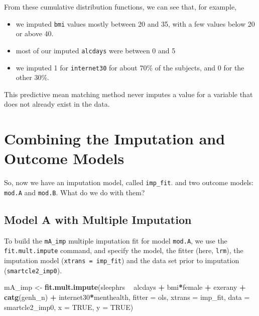 \documentclass[]{book}
\newenvironment{Shaded}{\begin{snugshade}}{\end{snugshade}}
\newcommand{\KeywordTok}[1]{\textcolor[rgb]{0.13,0.29,0.53}{\textbf{#1}}}
\newcommand{\DataTypeTok}[1]{\textcolor[rgb]{0.13,0.29,0.53}{#1}}
\newcommand{\StringTok}[1]{\textcolor[rgb]{0.31,0.60,0.02}{#1}}
\newcommand{\OtherTok}[1]{\textcolor[rgb]{0.56,0.35,0.01}{#1}}
\newcommand{\OperatorTok}[1]{\textcolor[rgb]{0.81,0.36,0.00}{\textbf{#1}}}
\newcommand{\NormalTok}[1]{#1}
\providecommand{\tightlist}{%
  \setlength{\itemsep}{0pt}\setlength{\parskip}{0pt}}
\theoremstyle{definition}
\theoremstyle{definition}
\theoremstyle{definition}
\theoremstyle{remark}
\begin{document}
From these cumulative distribution functions, we can see that, for
example,

\begin{itemize}
\tightlist
\item
  we imputed \texttt{bmi} values mostly between 20 and 35, with a few
  values below 20 or above 40.
\item
  most of our imputed \texttt{alcdays} were between 0 and 5
\item
  we imputed 1 for \texttt{internet30} for about 70\% of the subjects,
  and 0 for the other 30\%.
\end{itemize}

This predictive mean matching method never imputes a value for a
variable that does not already exist in the data.

\section{Combining the Imputation and Outcome
Models}\label{combining-the-imputation-and-outcome-models-1}

So, now we have an imputation model, called \texttt{imp\_fit}. and two
outcome models: \texttt{mod.A} and \texttt{mod.B}. What do we do with
them?

\subsection{Model A with Multiple
Imputation}\label{model-a-with-multiple-imputation}

To build the \texttt{mA\_imp} multiple imputation fit for model
\texttt{mod.A}, we use the \texttt{fit.mult.impute} command, and specify
the model, the fitter (here, \texttt{lrm}), the imputation model
(\texttt{xtrans\ =\ imp\_fit}) and the data set prior to imputation
(\texttt{smartcle2\_imp0}).

\begin{Shaded}
\begin{Highlighting}[]
\NormalTok{mA_imp <-}\StringTok{ }\KeywordTok{fit.mult.impute}\NormalTok{(sleephrs }\OperatorTok{~}\StringTok{ }\NormalTok{alcdays }\OperatorTok{+}\StringTok{ }\NormalTok{bmi}\OperatorTok{*}\NormalTok{female }\OperatorTok{+}\StringTok{ }
\StringTok{                              }\NormalTok{exerany }\OperatorTok{+}\StringTok{ }\KeywordTok{catg}\NormalTok{(genh_n) }\OperatorTok{+}\StringTok{ }
\StringTok{                              }\NormalTok{internet30}\OperatorTok{*}\NormalTok{menthealth,}
                          \DataTypeTok{fitter =}\NormalTok{ ols, }\DataTypeTok{xtrans =}\NormalTok{ imp_fit,}
                          \DataTypeTok{data =}\NormalTok{ smartcle2_imp0, }
                          \DataTypeTok{x =} \OtherTok{TRUE}\NormalTok{, }\DataTypeTok{y =} \OtherTok{TRUE}\NormalTok{)}
\end{Highlighting}
\end{Shaded}
\end{document}

